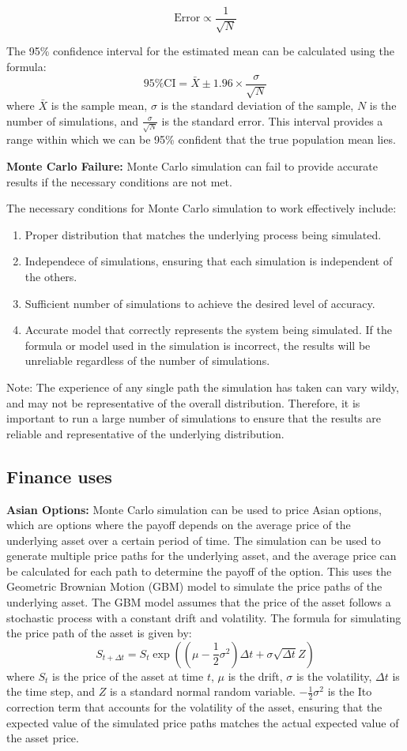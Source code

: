 $$\text{Error} \propto \frac{1}{\sqrt{N}}$$

The 95\% confidence interval for the estimated mean can be calculated using the
formula: $$\text{95\% CI} = \bar{X} \pm 1.96 \times \frac{\sigma}{\sqrt{N}}$$
where $\bar{X}$ is the sample mean, $\sigma$ is the standard deviation of the
sample, $N$ is the number of simulations, and $\frac{\sigma}{\sqrt{N}}$ is the
standard error. This interval provides a range within which we can be 95\%
confident that the true population mean lies.

\textbf{Monte Carlo Failure:} Monte Carlo simulation can fail to provide accurate
results if the necessary conditions are not met.

The necessary conditions for Monte Carlo simulation to work effectively
include:
\begin{enumerate}
    \item Proper distribution that matches the underlying process being simulated.
    \item Independece of simulations, ensuring that each simulation is independent of the
          others.
    \item Sufficient number of simulations to achieve the desired level of accuracy.
    \item Accurate model that correctly represents the system being simulated. If the
          formula or model used in the simulation is incorrect, the results will be
          unreliable regardless of the number of simulations.
\end{enumerate}

Note: The experience of any single path the simulation has taken can vary
wildy, and may not be representative of the overall distribution. Therefore, it
is important to run a large number of simulations to ensure that the results
are reliable and representative of the underlying distribution.

\subsection{Finance uses}
\textbf{Asian Options:} Monte Carlo simulation can be used to price Asian options,
which are options where the payoff depends on the average price of the
underlying asset over a certain period of time. The simulation can be used to
generate multiple price paths for the underlying asset, and the average price
can be calculated for each path to determine the payoff of the option. This
uses the Geometric Brownian Motion (GBM) model to simulate the price paths of
the underlying asset. The GBM model assumes that the price of the asset follows
a stochastic process with a constant drift and volatility. The formula for
simulating the price path of the asset is given by: $$S_{t+\Delta t} = S_t
    \exp\left((\mu - \frac{1}{2} \sigma^2) \Delta t + \sigma \sqrt{\Delta t}
    Z\right)$$ where $S_t$ is the price of the asset at time $t$, $\mu$ is the
drift, $\sigma$ is the volatility, $\Delta t$ is the time step, and $Z$ is a
standard normal random variable. $-\frac{1}{2} \sigma^2$ is the Ito correction
term that accounts for the volatility of the asset, ensuring that the expected
value of the simulated price paths matches the actual expected value of the
asset price.

